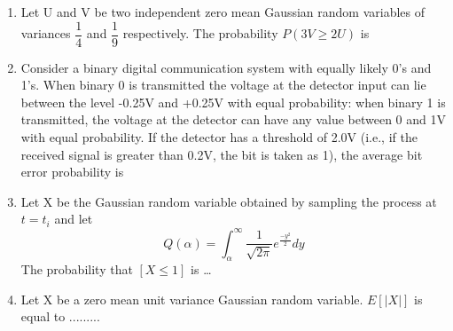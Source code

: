 \renewcommand{\theequation}{\theenumi}
\renewcommand{\thefigure}{\theenumi}
\renewcommand{\thetable}{\theenumi}
\begin{enumerate}[label=\thesection.\arabic*.,ref=\thesection.\theenumi]


\item Let U and V be two independent zero mean Gaussian random variables of variances $\dfrac{1}{4}$ and $\dfrac{1}{9}$ respectively. The probability $P(3V\geqslant2U)$ is
\begin{enumerate}
\end{enumerate}
%
\item Consider a binary digital communication system with equally likely 0's and 1's. When binary 0 is transmitted the voltage at the detector input can lie between the level -0.25V and +0.25V with equal probability: when binary 1 is transmitted, the voltage at the detector can have any value between 0 and 1V with equal probability. If the detector has a threshold of 2.0V (i.e., if the received signal is greater than 0.2V, the bit is taken as 1), the average bit error probability is
\begin{enumerate}
\end{enumerate}
%
\item Let X be the Gaussian random variable obtained by sampling the process at $t=t_i$ and let 
\begin{equation*}
Q(\alpha)={\int_{\alpha}^{\infty}}\dfrac{1}{\sqrt{2\pi}}e^{\frac{-y^2}{2}}dy
\end{equation*}
%
The probability that $[\textit{X}\leqslant1]$ is \dots
%
\item Let X be a zero mean unit variance Gaussian random variable. $E[|X|]$ is equal to .........
%
\\
\solution



\end{enumerate}
